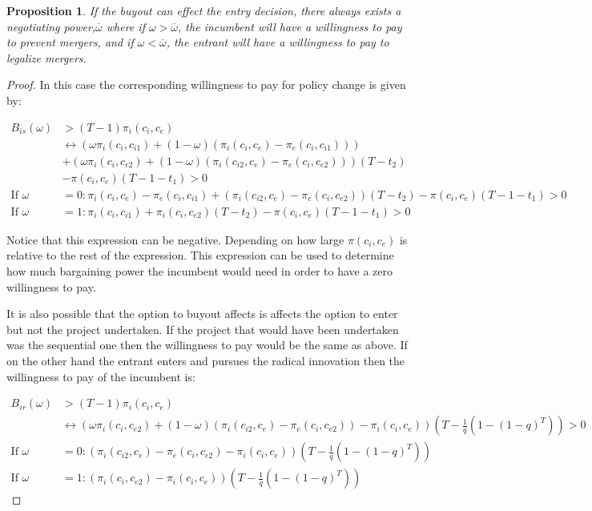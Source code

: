 \documentclass[12pt]{report}
\newtheorem{proposition}{Proposition}
\numberwithin{equation}{section}
\begin{document}
\begin{proposition}
If the buyout can effect the entry decision, there always exists a negotiating power,$\overline{\omega}$ where if $\omega > \overline{\omega}$, the incumbent will have a willingness to pay to prevent mergers, and if $\omega < \overline{\omega}$, the entrant will have a willingness to pay to legalize mergers. 
\end{proposition}
\begin{proof}
In this case the corresponding willingness to pay for policy change is given by:

\begin{align*}
B_{is}(\omega)&>(T-1) \pi_i(c_i,c_e) \\
& \leftrightarrow (\omega \pi_i(c_i,c_{i1})+(1-\omega)(\pi_i(c_i,c_{e})-\pi_e(c_i,c_{i1}))) \\
&+(\omega \pi_i(c_i,c_{e2})+(1-\omega)(\pi_i(c_{i2},c_e)-\pi_e(c_{i},c_{e2})))(T-t_2)
\\&- \pi(c_i,c_e)(T-1-t_1)>0 \\
\text{If }\omega &=0: \pi_i(c_i,c_{e})-\pi_e(c_i,c_{i1}) 
+(\pi_i(c_{i2},c_e)-\pi_e(c_{i},c_{e2}))(T-t_2)
- \pi(c_i,c_e)(T-1-t_1)>0 \\
\text{If }\omega &=1: \pi_i(c_i,c_{i1})
+\pi_i(c_i,c_{e2})(T-t_2)
- \pi(c_i,c_e)(T-1-t_1)>0 
\end{align*}

Notice that this expression can be negative. Depending on how large $\pi(c_i,c_e)$ is relative to the rest of the expression. This expression can be used to determine how much bargaining power the incumbent would need in order to have a zero willingness to pay. 

It is also possible that the option to buyout affects is affects the option to enter but not the project undertaken. If the project that would have been undertaken was the sequential one then the willingness to pay would be the same as above. If on the other hand the entrant enters and pursues the radical innovation then the willingness to pay of the incumbent is: 

\begin{align*}
B_{ir}(\omega)&>(T-1)\pi_i(c_i,c_e) \\
& \leftrightarrow (\omega \pi_i(c_i,c_{e2})+(1-\omega)(\pi_{i}(c_{i2},c_{e})-\pi_{e}(c_{i},c_{e2}))-\pi_i(c_i,c_e)) \left( T - \frac{1}{q} \left( 1-(1-q)^{T} \right) \right)>0 \\
\text{If }\omega &=0: (\pi_{i}(c_{i2},c_{e})-\pi_{e}(c_{i},c_{e2})-\pi_i(c_i,c_e)) \left( T - \frac{1}{q} \left( 1-(1-q)^{T} \right) \right) \\
\text{If }\omega &=1: ( \pi_i(c_i,c_{e2})-\pi_i(c_i,c_e)) \left( T - \frac{1}{q} \left( 1-(1-q)^{T} \right) \right)
\end{align*}


\end{proof}
\end{document}
